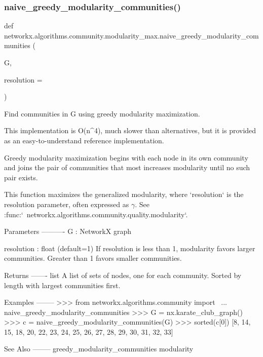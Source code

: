  \mbox{\label{namespacenetworkx_1_1algorithms_1_1community_1_1modularity__max_a60686893613d98cae2604ab2fb51d6f5}} 
\subsubsection{\texorpdfstring{naive\+\_\+greedy\+\_\+modularity\+\_\+communities()}{naive\_greedy\_modularity\_communities()}}
{\footnotesize\ttfamily def networkx.\+algorithms.\+community.\+modularity\+\_\+max.\+naive\+\_\+greedy\+\_\+modularity\+\_\+communities (\begin{DoxyParamCaption}\item[{}]{G,  }\item[{}]{resolution = {} }\end{DoxyParamCaption})}

\begin{DoxyVerb}Find communities in G using greedy modularity maximization.

This implementation is O(n^4), much slower than alternatives, but it is
provided as an easy-to-understand reference implementation.

Greedy modularity maximization begins with each node in its own community
and joins the pair of communities that most increases modularity until no
such pair exists.

This function maximizes the generalized modularity, where `resolution`
is the resolution parameter, often expressed as $\gamma$.
See :func:`~networkx.algorithms.community.quality.modularity`.

Parameters
----------
G : NetworkX graph

resolution : float (default=1)
    If resolution is less than 1, modularity favors larger communities.
    Greater than 1 favors smaller communities.

Returns
-------
list
    A list of sets of nodes, one for each community.
    Sorted by length with largest communities first.

Examples
--------
>>> from networkx.algorithms.community import \
... naive_greedy_modularity_communities
>>> G = nx.karate_club_graph()
>>> c = naive_greedy_modularity_communities(G)
>>> sorted(c[0])
[8, 14, 15, 18, 20, 22, 23, 24, 25, 26, 27, 28, 29, 30, 31, 32, 33]

See Also
--------
greedy_modularity_communities
modularity
\end{DoxyVerb}
 